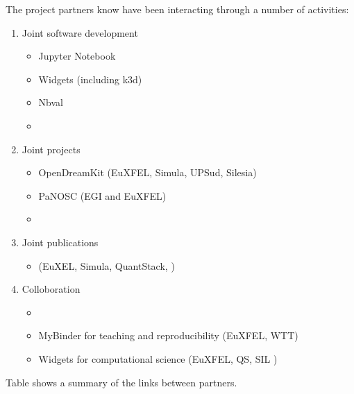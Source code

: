 
The project partners know have been interacting through a number of
activities:

\begin{enumerate}
\item Joint software development
  \begin{itemize}
  \item Jupyter Notebook 
  \item Widgets (including k3d)
  \item Nbval
  \item {}
  \end{itemize}

\item Joint projects
  \begin{itemize}
  \item OpenDreamKit (EuXFEL, Simula, UPSud, Silesia)
  \item PaNOSC (EGI and EuXFEL)
  \item {}
  \end{itemize}
\item Joint publications
  \begin{itemize}
  \item \cite{Kluyver2017} (EuXEL, Simula, QuantStack, )
  \end{itemize}

\item Colloboration
  \begin{itemize}
  \item {}

  \item MyBinder for teaching and reproducibility (EuXFEL, WTT)
  \item Widgets for computational science (EuXFEL, QS, SIL )
  \end{itemize}
\end{enumerate}

Table  shows a summary of the links
between partners.



